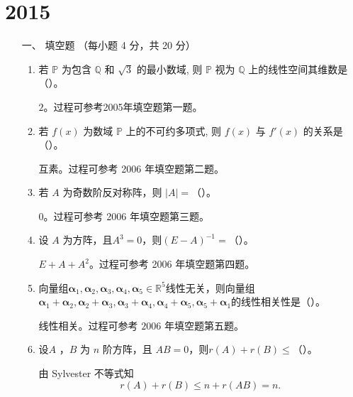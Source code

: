 \section{2015}
\begin{enumerate}[1~]
\renewcommand{\labelenumi}{\textbf{\theenumi. }}
\renewcommand{\Im}{\text{Im }}
\item[一、]
填空题 （每小题 4 分，共 20 分）
\begin{enumerate}[1.~]
\item
若 $\mathbb{P}$ 为包含 $\mathbb{Q}$ 和 $\sqrt{3}$ 的最小数域, 则 $\mathbb{P}$ 视为 $\mathbb{Q}$ 上的线性空间其维数是（\quad）。
\begin{solution}
$2$。过程可参考2005年填空题第一题。
\end{solution}

\item
若 $f(x)$ 为数域 $\mathbb{P}$ 上的不可约多项式, 则 $f(x)$ 与 $f'(x)$ 的关系是 （\quad）。
\begin{solution}
互素。过程可参考 2006 年填空题第二题。
\end{solution}

\item
若 $A$ 为奇数阶反对称阵，则 $|A| =$（\quad）。
\begin{solution}
0。过程可参考 2006 年填空题第三题。
\end{solution}

\item
设 $A$ 为方阵，且$A^3=0$，则$(E-A)^{-1}=$（\quad）。
\begin{solution}
$E+A+A^2$。过程可参考 2006 年填空题第四题。
\end{solution}

\item
向量组$\boldsymbol{\boldsymbol{\alpha}} _ { 1 } , \boldsymbol{\alpha} _ { 2 } , \boldsymbol{\alpha} _ { 3 } , \boldsymbol{\alpha} _ { 4 } , \boldsymbol{\alpha} _ { 5 } \in \mathbb { R } ^ { 5 }$线性无关，则向量组$\boldsymbol{\alpha} _ { 1 } + \boldsymbol{\alpha} _ { 2 } , \boldsymbol{\alpha} _ { 2 } + \boldsymbol{\alpha} _ { 3 } , \boldsymbol{\alpha} _ { 3 } + \boldsymbol{\alpha} _ { 4 } , \boldsymbol{\alpha} _ { 4 } + \boldsymbol{\alpha} _ { 5 } , \boldsymbol{\alpha} _ { 5 } + \boldsymbol{\alpha} _ { 1 }$的线性相关性是（\quad）。
\begin{solution}
线性相关。过程可参考 $2006$ 年填空题第五题。
\end{solution}

\item
设$A$ ，$B$ 为 $n$ 阶方阵，且 $AB=0$，则$r(A)+r(B)\le$（\quad）。
\begin{solution}
由 Sylvester 不等式知\[
r(A)+r(B)\le n+r(AB)=n.
\]
\end{solution}


\end{enumerate}
\end{enumerate}
